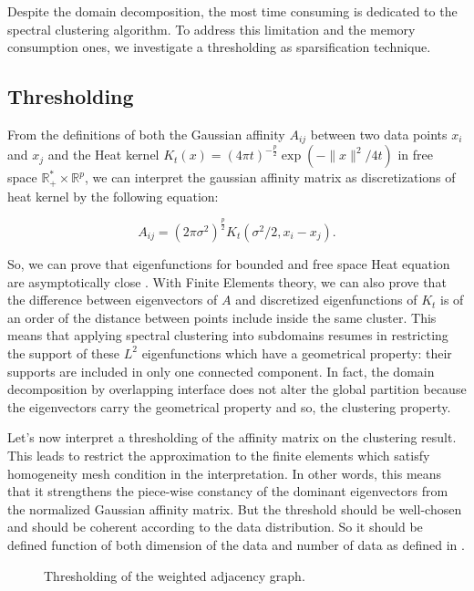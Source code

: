 \documentclass{llncs}
\begin{document}
Despite the domain decomposition, the most time consuming is dedicated to the
spectral clustering algorithm. To address this limitation and the memory
consumption ones,  we investigate a
thresholding as sparsification technique.

\subsection{Thresholding}

From the definitions of  both the Gaussian affinity $A_{ij}$ between two data
points $x_i$ and $x_j$ and the Heat kernel $K_t(x)=(4\pi
t)^{-\frac{p}{2}}\exp\left(-{\|x\|^2}/{4t}\right)$ in free space
$\mathbb{R}^*_+ \times \mathbb{R}^p$, we can interpret the gaussian affinity
matrix as discretizations of heat kernel by the following equation:

\begin{equation}
A_{ij}=(2\pi \sigma^2)^{\frac{p}{2}} K_t\left({\sigma^2}/{2},x_i-x_j\right). \label{lien}
\end{equation}

So, we can prove that eigenfunctions for bounded and free space Heat equation
are asymptotically close \cite{mouysset2}. With Finite Elements theory, we can
also prove that the difference between eigenvectors of $A$ and discretized
eigenfunctions of $K_t$ is of an order of the distance between points include
inside the same cluster. This means that applying spectral clustering into
subdomains resumes in restricting the support of these $L^2$ eigenfunctions
which have a geometrical property: their supports are included in only one
connected component. In fact, the domain decomposition by overlapping
interface does not alter the global partition because the eigenvectors carry the
geometrical property and so, the clustering property.

Let's now interpret a thresholding of the affinity matrix on the clustering
result. This leads to restrict the approximation to the finite elements which
satisfy homogeneity mesh condition in the interpretation. In other words,
this means that it strengthens the piece-wise constancy of the dominant eigenvectors
from the normalized Gaussian affinity matrix. But the threshold should be
well-chosen and should be coherent according to the data distribution. So it
should be defined function of both dimension of the data and number of data as
defined in \cite{mouysset2}.
 
 
\begin{figure}
  \begin{center}
    \hspace{2cm}
  \end{center}
  \caption{Thresholding of  the weighted adjacency graph.}
  \label{seuil}
 \end{figure}
\end{document}

